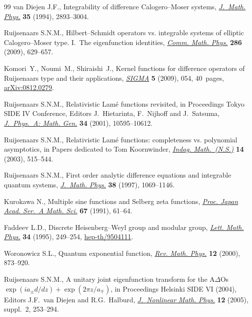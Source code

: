 \documentclass[11pt]{article}
\numberwithin{equation}{section}
\begin{document}
\begin{thebibliography}{99}
van Diejen J.F.,
Integrability of dif\/ference Calogero--Moser systems,
\href{http://dx.doi.org/10.1063/1.530498}{{\it J.~Math. Phys.}} {\bf 35} (1994), 2893--3004.

Ruijsenaars S.N.M.,
Hilbert--Schmidt operators vs. integrable systems of elliptic Calogero--Moser type. I.~The eigenfunction identities,
\href{http://dx.doi.org/10.1007/s00220-008-0707-y}{{\it Comm. Math. Phys.}} {\bf 286} (2009), 629--657.

Komori~Y., Noumi~M., Shiraishi~J.,
Kernel functions for dif\/ference operators of Ruijsenaars type and their applications,
\href{http://dx.doi.org/10.3842/SIGMA.2009.054}{{\it SIGMA}} {\bf 5} (2009), 054, 40~pages,
\href{http://arxiv.org/abs/0812.0279}{arXiv:0812.0279}.

Ruijsenaars S.N.M.,
Relativistic Lam\'e functions revisited,
in  Proceedings Tokyo SIDE IV Conference,
Editors J.~Hietarinta, F.~Nijhof\/f and J.~Satsuma,
\href{http://dx.doi.org/10.1088/0305-4470/34/48/323}{{\it J.~Phys.~A: Math. Gen.}} {\bf 34} (2001), 10595--10612.

Ruijsenaars S.N.M.,
Relativistic Lam\'e functions: completeness vs. polynomial asymptotics,
in Papers dedicated to Tom Koornwinder,
\href{http://dx.doi.org/10.1016/S0019-3577(03)90059-0}{{\it Indag. Math.~(N.S.)}} {\bf 14} (2003), 515--544.

Ruijsenaars S.N.M.,
First order analytic dif\/ference equations and integrable quantum systems,
\href{http://dx.doi.org/10.1063/1.531809}{{\it  J.~Math. Phys.}} {\bf 38} (1997),  1069--1146.

Kurokawa N.,
Multiple sine functions and Selberg zeta functions,
\href{http://dx.doi.org/10.3792/pjaa.67.61}{{\it Proc. Japan Acad. Ser.~A Math. Sci.}} {\bf 67} (1991), 61--64.

Faddeev L.D.,
Discrete Heisenberg--Weyl group and modular group,
\href{http://dx.doi.org/10.1007/BF01872779}{{\it Lett. Math. Phys.}} {\bf 34} (1995), 249--254,
\href{http://arxiv.org/abs/hep-th/9504111}{hep-th/9504111}.

Woronowicz S.L.,
Quantum exponential function,
\href{http://dx.doi.org/10.1142/S0129055X00000344}{{\it Rev. Math. Phys.}} {\bf 12} (2000), 873--920.

Ruijsenaars S.N.M.,
A unitary joint eigenfunction transform for the A$\Delta$Os $\exp(ia_{\pm}d/dz)+\exp(2\pi z/a_{\mp})$,
in Proceedings Helsinki SIDE VI (2004), Editors J.F.~van Diejen and R.G.~Halburd,
\href{http://dx.doi.org/10.2991/jnmp.2005.12.s2.19}{{\it J.~Nonlinear Math. Phys.}}  {\bf 12} (2005), suppl.~2,
253--294.



\end{thebibliography}
\end{document}
